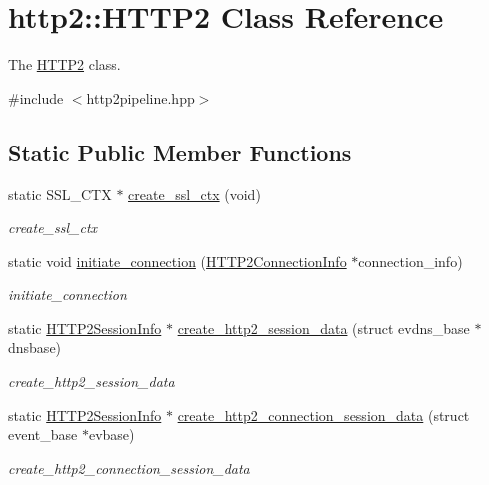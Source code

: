 \hypertarget{classhttp2_1_1HTTP2}{}\section{http2\+:\+:H\+T\+T\+P2 Class Reference}
\label{classhttp2_1_1HTTP2}


The \hyperlink{classhttp2_1_1HTTP2}{H\+T\+T\+P2} class.  




{\ttfamily \#include $<$http2pipeline.\+hpp$>$}

\subsection*{Static Public Member Functions}
\begin{DoxyCompactItemize}
\item 
static S\+S\+L\+\_\+\+C\+TX $\ast$ \hyperlink{classhttp2_1_1HTTP2_acfca7c774fb30ce95e0ee51edcb4c729}{create\+\_\+ssl\+\_\+ctx} (void)
\begin{DoxyCompactList}\small\item\em create\+\_\+ssl\+\_\+ctx \end{DoxyCompactList}\item 
static void \hyperlink{classhttp2_1_1HTTP2_a351a2726e2b53ab6ac19995ea18e98e1}{initiate\+\_\+connection} (\hyperlink{classhttp2_1_1HTTP2ConnectionInfo}{H\+T\+T\+P2\+Connection\+Info} $\ast$connection\+\_\+info)
\begin{DoxyCompactList}\small\item\em initiate\+\_\+connection \end{DoxyCompactList}\item 
static \hyperlink{classhttp2_1_1HTTP2SessionInfo}{H\+T\+T\+P2\+Session\+Info} $\ast$ \hyperlink{classhttp2_1_1HTTP2_a98e346d0d6107737b9323debc13f7921}{create\+\_\+http2\+\_\+session\+\_\+data} (struct evdns\+\_\+base $\ast$dnsbase)
\begin{DoxyCompactList}\small\item\em create\+\_\+http2\+\_\+session\+\_\+data \end{DoxyCompactList}\item 
static \hyperlink{classhttp2_1_1HTTP2SessionInfo}{H\+T\+T\+P2\+Session\+Info} $\ast$ \hyperlink{classhttp2_1_1HTTP2_ad6d2eb9ff7908ac623dfc77bc10e7d46}{create\+\_\+http2\+\_\+connection\+\_\+session\+\_\+data} (struct event\+\_\+base $\ast$evbase)
\begin{DoxyCompactList}\small\item\em create\+\_\+http2\+\_\+connection\+\_\+session\+\_\+data \end{DoxyCompactList}\item 

\end{DoxyCompactItemize}
